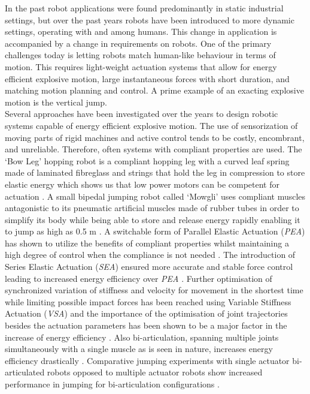 \documentclass[letterpaper, 10 pt, conference]{ieeeconf}  %
\begin{document}
In the past robot applications were found predominantly in static industrial settings, but over the past years robots have been introduced to more dynamic settings, operating with and among humans. This change in application is accompanied by a change in requirements on robots. One of the primary challenges today is letting robots match human-like behaviour in terms of motion. This requires light-weight actuation systems that allow for energy efficient explosive motion, large  instantaneous  forces  with  short  duration, and matching motion planning and control. A prime example of an exacting explosive motion is the vertical jump.
\\
Several approaches have been investigated over the years to design robotic systems capable of energy efficient explosive motion. The use of sensorization of moving parts of rigid machines and active control tends to be costly, encombrant, and unreliable. Therefore, often systems with compliant properties are used. The `Bow Leg' hopping robot is a compliant hopping leg with a curved leaf spring made of laminated fibreglass and strings that hold the leg in compression to store elastic energy which shows us that low power motors  can  be  competent  for  actuation \cite{zeglin1999bow}. A small bipedal jumping robot called `Mowgli' uses compliant muscles antagonistic to its pneumatic artificial muscles made of rubber tubes in order to simplify its body while being able to store and release energy rapidly enabling it to jump as high as 0.5 m \cite{niiyama2007mowgli}. A switchable form of Parallel Elastic Actuation (\textit{PEA}) has shown to utilize the benefits of compliant properties whilst maintaining a high degree of control when the compliance is not needed \cite{liu2015spear}. The introduction of Series Elastic Actuation (\textit{SEA}) ensured more accurate and stable force control leading to increased energy efficiency over \textit{PEA} \cite{pratt1995series,yesilevskiy2015comparison}.
Further optimisation of synchronized variation of stiffness and velocity for movement
in the shortest time while limiting possible impact forces has been reached using Variable Stiffness Actuation (\textit{VSA}) \cite{garabini2011optimality} and the importance of the optimisation of joint trajectories besides the actuation parameters has been shown to be a major factor in the increase of energy efficiency \cite{velasco2013soft}. Also bi-articulation, spanning multiple joints simultaneously with a single muscle as is seen in nature, increases energy efficiency drastically \cite{schenau1989rotation,prilutsky1994tendon}. Comparative jumping experiments with single actuator bi-articulated robots opposed to multiple actuator robots show increased performance in jumping for bi-articulation configurations \cite{oshima2007jumping,babivc2009biarticulated,hyon2002development}. \\
\end{document}
